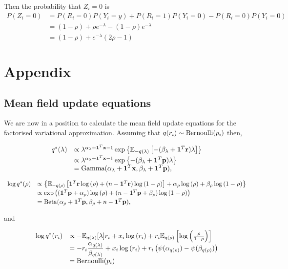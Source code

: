 \documentclass{article}[12pt]
\begin{document}
Then the probability that $Z_i = 0$ is
$$
\begin{array}{rl}
P(Z_i = 0) &= P(R_i = 0)P(Y_i = y) + P(R_i = 1) P(Y_i = 0) - P(R_i = 0) P(Y_i = 0) \\
&= (1 - \rho) + \rho e^{-\lambda} - (1 - \rho) e^{-\lambda} \\
&= (1 - \rho) + e^{-\lambda}(2 \rho - 1)
\end{array}
$$

\section{Appendix} 

\subsection{Mean field update equations}
We are now in a position to calculate the mean field update equations for the factorised
variational approximation.
Assuming that $q(r_i) \sim \text{Bernoulli} (p_i)$ then,

$$
\begin{array}{rl}
q^*(\lambda)
    & \propto 
    \lambda^{\alpha_\lambda+{\bf 1}^T{\bf x} - 1} 
    \exp\left\{ 
    {\mathbb E}_{-q(\lambda)} \left[
    -(\beta_\lambda + {\bf 1}^T{\bf r}) \lambda 
    \right] 
    \right\} 
    \\ [0.5ex]
    &
    \propto \lambda^{\alpha_\lambda+{\bf 1}^T{\bf x} - 1} \exp{\left \{-(\beta_\lambda + {\bf1}^T{\bf p})\lambda \right \} } 
\\
    & = \text{Gamma} (\alpha_\lambda+{\bf 1}^T{\bf x}, \beta_\lambda+{\bf 1}^T{\bf p}),
\end{array}
$$

$$
\begin{array}{rl}
\log{q^*(\rho)} 
    &
    \propto \left\{ 
    {\mathbb E}_{-q(\rho)}\left[ 
    {\bf 1}^T{\bf r} \log{(\rho)} 
    + (n - {\bf 1}^T{\bf r}) \log{(1 - \rho)} 
    \right] 
    + \alpha_\rho \log{(\rho)} 
    + \beta_\rho \log{(1 - \rho)} 
    \right\} 
    \\ [0.5ex]
    &
    \propto \exp \left( 
    ({\bf 1}^T{\bf p} + \alpha_\rho) \log{(\rho)} 
    + (n - {\bf 1}^T{\bf p} + \beta_\rho) \log{(1 - \rho)} 
    \right) 
    \\ [0.5ex]
    &= \text{Beta} (\alpha_\rho + {\bf 1}^T{\bf p}, \beta_\rho + n - {\bf 1}^T{\bf p}),
\end{array}
$$

\noindent and

$$
\begin{array}{rl}
\ds \log{q^*(r_i)} &\propto -\bE_{q(\lambda)} [\lambda ] r_i + x_i \log{(r_i)} + r_i \bE_{q(\rho)} \left[\log{\left(\frac{\rho}{1 - \rho}\right)}\right]\\[0.5ex]
& \ds = -r_i \frac{\alpha_{q(\lambda)}}{\beta_{q(\lambda)}} + x_i \log{(r_i)} + r_i \left(\psi(\alpha_{q(\rho)}) - \psi(\beta_{q(\rho)})\right)\\ [0.5ex]%
& \ds = \text{Bernoulli}(p_i)
\end{array}
$$
\end{document}
